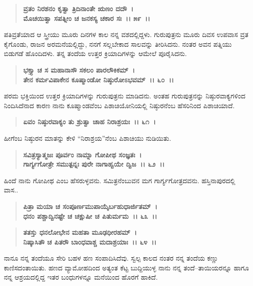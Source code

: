 \begin{verse}
\textbf{ವ್ರತಂ ನಿರಶನಂ ಕೃತ್ವಾ ತ್ರಿದಿನಾಂತೇ ಋಣಂ ದದೌ~।}\\\textbf{ಮೊಚಯಿತ್ವಾ ಸಪತ್ನೀಂ ಚ ಜನಕಸ್ಯ ಚಕಾರ ಸಃ~।। ೫೯~।।}
\end{verse}

ಪತಿವ್ರತೆಯಾದ ಆ ಸ್ತ್ರೀಯು ಮೂರು ದಿನಗಳ ಕಾಲ ನನ್ನ ವಶದಲ್ಲಿದ್ದಳು. ಗುರುಪುತ್ರನು ಮೂರು ದಿವಸ ಉಪವಾಸ ವ್ರತ ಕೈಗೊಂಡು, ರಾಜನ ಅರಮನೆಯಲ್ಲಿದ್ದು, ನನಗೆ ಸಲ್ಲಬೇಕಾದ ಸಾಲವನ್ನು ತೀರಿಸಿದನು. ನಂತರ ಅವನ ಪತ್ನಿಯು ಬಿಡುಗಡೆ ಹೊಂದಿದಳು. ತನ್ನ ತಂದೆಯ ಉತ್ತರ ಕ್ರಿಯಾದಿಗಳನ್ನು ಆಮೇಲೆ ಪೂರೈಸಿದನು.

\begin{verse}
\textbf{ಭಕ್ತ್ಯಾ ಚ ಸ ಮಹಾನಾಸೌ ಸಕಲಂ ಪಾರಲೌಕಿಕಮ್~।}\\\textbf{ತೇನ ಕರ್ಮವಿಪಾಕೇನ ಕೂಷ್ಮಾಂಡೋ ನಿಷ್ಠುರೋಽಭವಮ್~।। ೬೦~।।}
\end{verse}

ಪರಮ ಭಕ್ತಿಯಿಂದ ಉತ್ತರ ಕ್ರಿಯಾದಿಗಳನ್ನು ಗುರುಪುತ್ರನು ಮಾಡಿದನು. ಅಂತಹ ಗುರುಪುತ್ರನನ್ನು ನಿಷ್ಠುರವಾಕ್ಯಗಳಿಂದ ನಿಂದಿಸಿದೆನಾದ ಕಾರಣ ನಾನು ಕೂಷ್ಮಾಂಡವೆಂಬ ಪಿಶಾಚಿಯೋನಿಯಲ್ಲಿ ನಿಷ್ಠುರನೆಂಬ ಹೆಸರಿನಿಂದ ಪಿಶಾಚಿಯಾದೆ.

\begin{verse}
\textbf{ಏವಂ ನಿಷ್ಠುರವಾಕ್ಯಂ ತು ಶ್ರುತ್ವಾ ಚಾಹ ನಿರಾಶ್ರಯಃ~।। ೬೧~।}
\end{verse}

ಹೀಗೆಂಬ ನಿಷ್ಠುರನ ಮಾತನ್ನು ಕೇಳಿ “ನಿರಾಶ್ರಯ”ನೆಂಬ ಪಿಶಾಚಿಯು ನುಡಿಯಿತು.

\begin{verse}
\textbf{ಸವಿತ್ರಸ್ಯಾತ್ಮಜಃ ಪೂರ್ವಂ ನಾಮ್ನಾ ಗೋಪೀಥ ಸಂಜ್ಞತಃ~।}\\\textbf{ಗಾರ್ಗ್ಯಗೋತ್ರೇ ಸಮುತ್ಪನ್ನಃ ಪುರೇ ನಾಗಾಹ್ವಯೇ ದ್ವಿಜ~।। ೬೨~।।}
\end{verse}

ಹಿಂದೆ ನಾನು ಗೋಪೀಥ ಎಂಬ ಹೆಸರುಳ್ಳವನು. ಸಮಿತ್ರನೆಂಬುವನ ಮಗ ಗಾರ್ಗ್ಯಗೋತ್ರದವನು. ಹಸ್ತಿನಾಪುರದಲ್ಲಿ ವಾಸ..

\begin{verse}
\textbf{ಪಿತ್ರಾ ಮಯಾ ಚ ಸಂಪೂರ್ಣಮುಪಾಯೈರ್ಬಹುಧಾರ್ಜಿತಮ್~।}\\\textbf{ಧನಂ ಪಶ್ಚಾದ್ವಿನಷ್ಟೇ ಚ ಚಕ್ಷುಷೀ ಚ ಪಿತುರ್ಮಮ~।। ೬೩~।।}
\end{verse}

\begin{verse}
\textbf{ತತಸ್ತು ಧನಲೋಭೇನ ಮಹತಾ ಮೂಢಧೀರಹಮ್~।}\\\textbf{ನಿಷ್ಕಾಸಿತೌ ಚ ಪಿತರೌ‌ ಬಾಂಧವಾಶ್ಚ ಮದಾಶ್ರಯಾಃ~।। ೬೪~।।}
\end{verse}

ನಾನೂ ನನ್ನ ತಂದೆಯೂ ಸೇರಿ ಬಹಳ ಹಣ ಸಂಪಾದಿಸಿದೆವು. ಸ್ವಲ್ಪ ಕಾಲದ ನಂತರ ನನ್ನ ತಂದೆಯ ಕಣ್ಣು ಕಾಣಿಸದಂತಾಯಿತು. ಹಣದ ವ್ಯಾಮೋಹದಿಂದ ಅತ್ಯಂತ ಕೆಟ್ಟ ಬುದ್ದಿಯುಳ್ಳ ನಾನು ನನ್ನ ತಂದೆ–ತಾಯಿಯರನ್ನೂ ಹಾಗೂ ನನ್ನ ಆಶ್ರಯದಲ್ಲಿದ್ದ ಇತರ ಬಂಧುಗಳನ್ನೂ ಮನೆಯಿಂದ ಹೊರಗೆ ಹಾಕಿದೆ.

